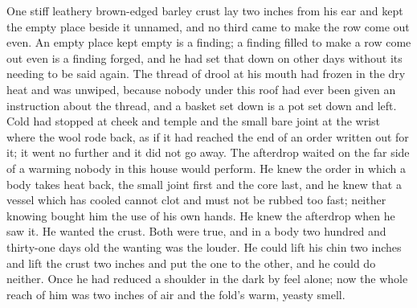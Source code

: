 \scenebreak

One stiff leathery brown-edged barley crust lay two inches from his ear and kept the empty place beside it unnamed, and no third came to make the row come out even. An empty place kept empty is a finding; a finding filled to make a row come out even is a finding forged, and he had set that down on other days without its needing to be said again. The thread of drool at his mouth had frozen in the dry heat and was unwiped, because nobody under this roof had ever been given an instruction about the thread, and a basket set down is a pot set down and left. Cold had stopped at cheek and temple and the small bare joint at the wrist where the wool rode back, as if it had reached the end of an order written out for it; it went no further and it did not go away. The afterdrop waited on the far side of a warming nobody in this house would perform. He knew the order in which a body takes heat back, the small joint first and the core last, and he knew that a vessel which has cooled cannot clot and must not be rubbed too fast; neither knowing bought him the use of his own hands. He knew the afterdrop when he saw it. He wanted the crust. Both were true, and in a body two hundred and thirty-one days old the wanting was the louder. He could lift his chin two inches and lift the crust two inches and put the one to the other, and he could do neither. Once he had reduced a shoulder in the dark by feel alone; now the whole reach of him was two inches of air and the fold's warm, yeasty smell.

